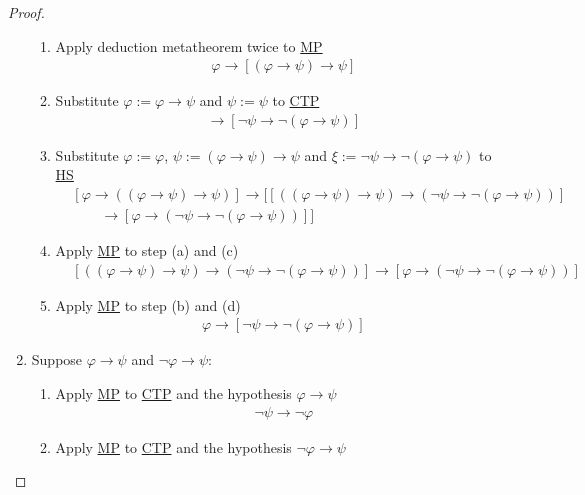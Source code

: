 \documentclass{treatise}
\begin{document}
\begin{proof}
\begin{enumerate}
    \begin{enumerate}
        \item Apply deduction metatheorem twice to \hyperref[HPL-R-MP]{MP}
        \begin{align*}
            \varphi \to [(\varphi \to \psi) \to \psi]
        \end{align*}
        \item Substitute $\varphi := \varphi \to \psi$ and $\psi := \psi$ to \hyperref[HPL-T-CTP]{CTP}
        \begin{align*}
            [(\varphi \to \psi) \to \psi] \to [\neg \psi \to \neg (\varphi \to \psi)]
        \end{align*}
        \item Substitute $\varphi := \varphi$, $\psi := (\varphi \to \psi) \to \psi$ and $\xi := \neg \psi \to \neg (\varphi \to \psi)$ to \hyperref[HPL-T-HS]{HS}
        \begin{align*}
            & [\varphi \to ((\varphi \to \psi) \to \psi)] \to [[((\varphi \to \psi) \to \psi) \to (\neg \psi \to \neg (\varphi \to \psi))]
            \\
            & \qquad \to [\varphi \to (\neg \psi \to \neg (\varphi \to \psi))]]
        \end{align*}
        \item Apply \hyperref[HPL-R-MP]{MP} to step (a) and (c)
        \begin{align*}
            & [((\varphi \to \psi) \to \psi) \to (\neg \psi \to \neg (\varphi \to \psi))] \to [\varphi \to (\neg \psi \to \neg (\varphi \to \psi))]
        \end{align*}
        \item Apply \hyperref[HPL-R-MP]{MP} to step (b) and (d)
        \begin{align*}
            \varphi \to [\neg \psi \to \neg (\varphi \to \psi)]
        \end{align*}
    \end{enumerate}
    \item Suppose $\varphi \to \psi$ and $\neg \varphi \to \psi$:
    \begin{enumerate}
        \item Apply \hyperref[HPL-R-MP]{MP} to \hyperref[HPL-T-CTP]{CTP} and the hypothesis $\varphi \to \psi$
        \begin{align*}
            \neg \psi \to \neg \varphi
        \end{align*}
        \item Apply \hyperref[HPL-R-MP]{MP} to \hyperref[HPL-T-CTP]{CTP} and the hypothesis $\neg \varphi \to \psi$

\end{enumerate}
\end{enumerate}
\end{proof}
\end{document}
